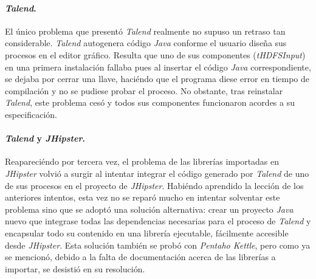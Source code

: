 \paragraph*{\textit{Talend}.} El único problema que presentó \textit{Talend} realmente no supuso un retraso tan considerable. \textit{Talend} autogenera código \textit{Java} conforme el usuario diseña sus procesos en el editor gráfico. Resulta que uno de sus componentes (\textit{tHDFSInput}) en una primera instalación fallaba pues al insertar el código \textit{Java} correspondiente, se dejaba por cerrar una llave, haciéndo que el programa diese error en tiempo de compilación y no se pudiese probar el proceso. No obstante, tras reinstalar \textit{Talend}, este problema cesó y todos sus componentes funcionaron acordes a su especificación. 

\paragraph*{\textit{Talend} y \textit{JHipster}.} Reapareciéndo por tercera vez, el problema de las librerías importadas en \textit{JHipster} volvió a surgir al intentar integrar el código generado por \textit{Talend} de uno de sus procesos en el proyecto de \textit{JHipster}. Habiéndo aprendido la lección de los anteriores intentos, esta vez no se reparó mucho en intentar solventar este problema sino que se adoptó una solución alternativa: crear un proyecto \textit{Java} nuevo que integrase todas las dependencias necesarias para el proceso de \textit{Talend} y encapsular todo su contenido en una librería ejecutable, fácilmente accesible desde \textit{JHipster}. Esta solución también se probó con \textit{Pentaho Kettle}, pero como ya se mencionó, debido a la falta de documentación acerca de las librerías a importar, se desistió en su resolución.




























